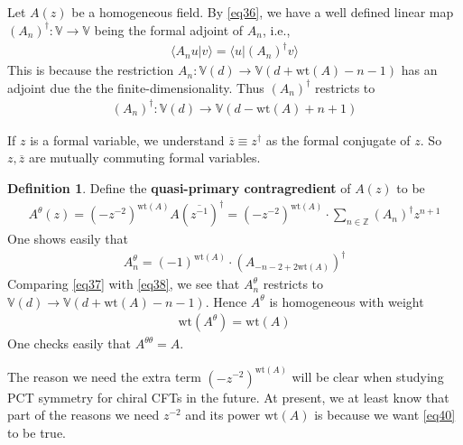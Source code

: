 \documentclass[12pt,b5paper,notitlepage]{article}
\theoremstyle{definition}
\newtheorem{df}{Definition}[section]
\theoremstyle{plain}
\newcommand{\ovl}{\overline}
\newcommand{\bk}[1]{\langle {#1}\rangle}
\newcommand{\Vbb}{\mathbb V}
\newcommand{\Zbb}{\mathbb Z}
\newcommand{\wt}{\mathrm{wt}}
\numberwithin{equation}{section}
\begin{document}
\subsection{}


Let $A(z)$ be a homogeneous field. By \eqref{eq36}, we have a well defined linear map $(A_n)^\dagger:\Vbb\rightarrow\Vbb$ being the formal adjoint of $A_n$, i.e.,
\begin{align*}
\bk{A_nu|v}=\bk{u|(A_n)^\dagger v}
\end{align*}
This is because the restriction $A_n:\Vbb(d)\rightarrow\Vbb(d+\wt(A)-n-1)$ has an adjoint due the the finite-dimensionality. Thus $(A_n)^\dagger$ restricts to
\begin{align}\label{eq38}
(A_n)^\dagger:\Vbb(d)\rightarrow\Vbb(d-\wt(A)+n+1)
\end{align}

If $z$ is a formal variable, we understand $\ovl z\equiv z^\dagger$ as the formal conjugate of $z$. So $z,\ovl z$ are mutually commuting formal variables.

\begin{df}\label{lb20}
Define the \textbf{quasi-primary contragredient}   of $A(z)$ to be
\begin{align}
A^\theta(z)=(-z^{-2})^{\wt(A)}A(\ovl{z^{-1}})^\dagger=(-z^{-2})^{\wt(A)}\cdot \sum_{n\in\Zbb} (A_n)^\dagger z^{n+1}
\end{align}
One shows easily that
\begin{align}\label{eq37}
A^\theta_n=(-1)^{\wt(A)}\cdot (A_{-n-2+2\wt(A)})^\dagger
\end{align}
Comparing \eqref{eq37} with \eqref{eq38}, we see that $A_n^\theta$ restricts to $\Vbb(d)\rightarrow\Vbb(d+\wt(A)-n-1)$. Hence $A^\theta$ is homogeneous with weight
\begin{align}\label{eq40}
\wt(A^\theta)=\wt(A)
\end{align}
One checks easily that $A^{\theta\theta}=A$.
\end{df}

The reason we need the extra term $(-z^{-2})^{\wt(A)}$ will be clear when studying PCT symmetry for chiral CFTs in the future. At present, we at least know that part of the reasons we need $z^{-2}$ and its power $\wt(A)$ is because we want \eqref{eq40} to be true.



\subsection{}
\end{document}
